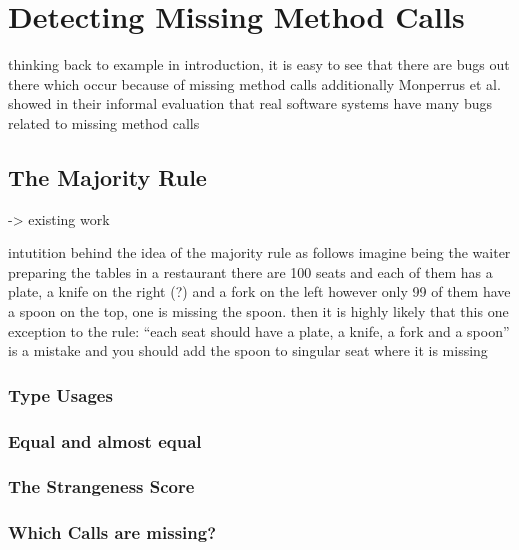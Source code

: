 \chapter{Detecting Missing Method Calls}\label{ch:dmmc}

thinking back to example in introduction, it is easy to see that there are bugs out there which occur because of missing method calls
additionally Monperrus et al. showed in their informal evaluation that real software systems have many bugs related to missing method calls


\section{The Majority Rule}
-> existing work

intutition behind the idea of the majority rule as follows
imagine being the waiter preparing the tables in a restaurant
there are 100 seats and each of them has a plate, a knife on the right (?) and a fork on the left
however only 99 of them have a spoon on the top,
one is missing the spoon.
then it is highly likely that this one exception to the rule: ``each seat should have a plate, a knife, a fork and a spoon'' is a mistake
and you should add the spoon to singular seat where it is missing

\subsection{Type Usages}

\subsection{Equal and almost equal}

\subsection{The Strangeness Score}

\subsection{Which Calls are missing?}

